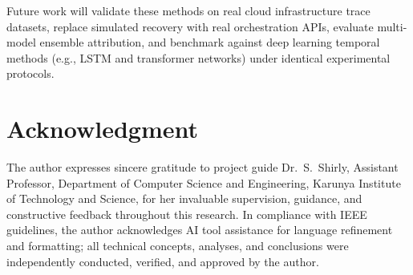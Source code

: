 \documentclass[conference]{IEEEtran}
\begin{document}
Future work will validate these methods on real cloud infrastructure trace datasets, replace simulated recovery with real orchestration APIs, evaluate multi-model ensemble attribution, and benchmark against deep learning temporal methods (e.g., LSTM and transformer networks) under identical experimental protocols.

\section*{Acknowledgment}
The author expresses sincere gratitude to project guide Dr.~S.~Shirly, Assistant Professor, Department of Computer Science and Engineering, Karunya Institute of Technology and Science, for her invaluable supervision, guidance, and constructive feedback throughout this research. In compliance with IEEE guidelines, the author acknowledges AI tool assistance for language refinement and formatting; all technical concepts, analyses, and conclusions were independently conducted, verified, and approved by the author.

\balance
{}


\end{document}

